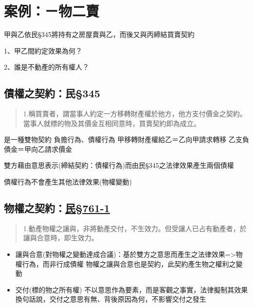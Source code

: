 \documentclass[
]{book}
\begin{document}
\hypertarget{ux6848ux4f8bux3127ux7269ux4e8cux8ce3}{%
\section{案例：ㄧ物二賣}\label{ux6848ux4f8bux3127ux7269ux4e8cux8ce3}}

甲與乙依民§345將持有之房屋賣與乙，而後又與丙締結買賣契約

1、甲乙間約定效果為何？

2、誰是不動產的所有權人？

\hypertarget{ux50b5ux6b0aux4e4bux5951ux7d04ux6c11345}{%
\subsection{債權之契約：民§345}\label{ux50b5ux6b0aux4e4bux5951ux7d04ux6c11345}}

\begin{quote}
1.稱買賣者，謂當事人約定一方移轉財產權於他方，他方支付價金之契約。
當事人就標的物及其價金互相同意時，買賣契約即為成立。
\end{quote}

是一種雙物契約
負擔行為、債權行為
甲移轉財產權給乙＝乙向甲請求轉移
乙支負債金＝甲向乙請求價金

雙方藉由意思表示(締結契約：債權行為)而由民§345之法律效果產生兩個債權

債權行為不會產生其他法律效果(物權變動)

\hypertarget{ux7269ux6b0aux4e4bux5951ux7d04ux6c11761-1}{%
\subsection{\texorpdfstring{物權之契約：\href{https://law.moj.gov.tw/LawClass/LawSingle.aspx?pcode=B0000001\&flno=761}{民§761-1}}{物權之契約：民§761-1}}\label{ux7269ux6b0aux4e4bux5951ux7d04ux6c11761-1}}

\begin{quote}
1.動產物權之讓與，非將動產交付，不生效力。但受讓人已占有動產者，於讓與合意時，即生效力。
\end{quote}

\begin{itemize}
\item
  讓與合意(對物權之變動達成合議)：基於雙方之意思而產生之法律效果=\textgreater 物權行為，而非行成債權
  物權之讓與合意也是契約，此契約產生物之權利之變動
\item
  交付(標的物之所有權)
  不以意思作為要素，而是客觀之事實，法律擬制其效果
  換句話說，交付之意思有無、背後原因為何，不影響交付之發生
\end{itemize}
\end{document}
